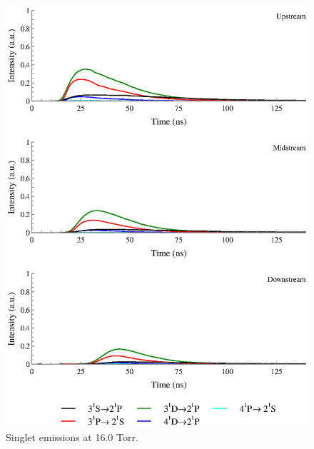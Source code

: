 \begin{figure}
  \centering
  \includegraphics{./chapters/extraem/figures/16torr_s.eps}
  \caption{Singlet emissions at 16.0 Torr.}
\end{figure}
